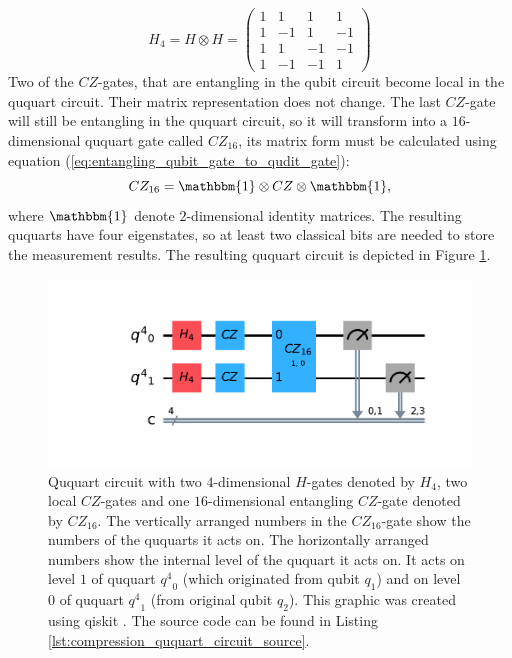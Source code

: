     \begin{equation}
      \label{eq:4_dimensional_hadamard}
      H_4=H\otimes H=
      \begin{pmatrix}
        1 &  1 &  1 &  1\\
        1 & -1 &  1 & -1\\
        1 &  1 & -1 & -1\\
        1 & -1 & -1 &  1
      \end{pmatrix}
    \end{equation}
    Two of the $CZ$-gates, that are entangling in the qubit circuit become local in the ququart circuit. Their matrix representation does not change. The last $CZ$-gate will still be entangling in the ququart circuit, so it will transform into a $16$-dimensional ququart gate called $CZ_{16}$, its matrix form must be calculated using equation (\ref{eq:entangling_qubit_gate_to_qudit_gate}):
    \begin{equation}
      \label{eq:8_dimensional_cz}
      CZ_{16}=\mathbbm{1}\otimes CZ \otimes\mathbbm{1},
    \end{equation}
    where $\mathbbm{1}$ denote $2$-dimensional identity matrices. The resulting ququarts have four eigenstates, so at least two classical bits are needed to store the measurement results. The resulting ququart circuit is depicted in Figure \ref{fig:compressed_ququart_circuit}.

    \begin{figure}[H]
      \centering
      \includegraphics[width=\linewidth]{figures/compressed.pdf}
      \caption{Ququart circuit with two $4$-dimensional $H$-gates denoted by $H_4$, two local $CZ$-gates and one $16$-dimensional entangling $CZ$-gate denoted by $CZ_{16}$. The vertically arranged numbers in the $CZ_{16}$-gate show the numbers of the ququarts it acts on. The horizontally arranged numbers show the internal level of the ququart it acts on. It acts on level $1$ of ququart ${q^4}_0$ (which originated from qubit $q_1$) and on level $0$ of ququart ${q^4}_1$ (from original qubit $q_2$). This graphic was created using qiskit \cite{qiskit2024}. The source code can be found in Listing \ref{lst:compression_ququart_circuit_source}.}
      \label{fig:compressed_ququart_circuit}
    \end{figure}
